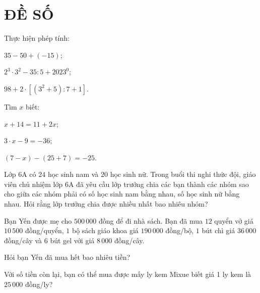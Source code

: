 


\section{ĐỀ SỐ \thesection }
\setcounter{bt}{0}
\begin{bt} Thực hiện phép tính:
	\begin{listEX}[3]
		\item $35-50+(-15)$; 
		\item $2^{3} \cdot 3^{2}-35: 5+2023^{0}$;
		\item $98+2 \cdot\left[\left(3^{2}+5\right): 7+1\right]$.
	\end{listEX}
	

\end{bt}


\begin{bt} Tìm $x$ biết:
	\begin{listEX}[3]
		\item $x+14=11+2x$;
		\item $3\cdot x-9=-36$;
		\item $(7-x) - (25+7 ) = -25$.
	\end{listEX}
	
	
	\end{bt}

\begin{bt} Lớp 6A có $24$ học sinh nam và $20$ học sinh nữ. Trong buổi thi nghi thức đội, giáo viên chủ nhiệm lớp 6A đã yêu cầu lớp trưởng chia các bạn thành các nhóm sao cho giữa các nhóm phải có số học sinh nam bằng nhau, số học sinh nữ bằng nhau. Hỏi rằng lớp trưởng chia được nhiều nhất bao nhiêu nhóm?
	
	
\end{bt}


\begin{bt} Bạn Yến được mẹ cho $500\,000$ đồng để đi nhà sách. Bạn đã mua $12$ quyển vở giá $10\,500$ đồng/quyển, $1$ bộ sách giáo khoa giá $190\,000$ đồng/bộ, $1$ bút chì giá $36\,000$ đồng/cây và $6$ bút gel với giá $8\,000$ đồng/cây.
	\begin{listEX}
		\item Hỏi bạn Yến đã mua hết bao nhiêu tiền?
		\item Với số tiền còn lại, bạn có thể mua được mấy ly kem Mixue biết giá 1 ly kem là $25\,000$ đồng/ly?
	\end{listEX}
	

	\end{bt}
	

